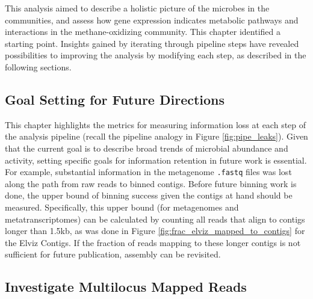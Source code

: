 This analysis aimed to describe a holistic picture of the microbes in the communities, and assess how gene expression indicates metabolic pathways and interactions in the methane-oxidizing community.
This chapter identified a starting point.
Insights gained by iterating through pipeline steps have revealed possibilities to improving the analysis by modifying each step, as described in the following sections.

\subsection{Goal Setting for Future Directions}    %

This chapter highlights the metrics for measuring information loss at each step of the analysis pipeline (recall the pipeline analogy in Figure \ref{fig:pipe_leaks}).
Given that the current goal is to describe broad trends of microbial abundance and activity, setting specific goals for information retention in future work is essential.
For example, substantial information in the metagenome \texttt{.fastq} files was lost along the path from raw reads to binned contigs.
Before future binning work is done, the upper bound of binning success given the contigs at hand should be measured.
Specifically, this upper bound (for metagenomes and metatranscriptomes) can be calculated by counting all reads that align to contigs longer than 1.5kb, as was done in Figure \ref{fig:frac_elviz_mapped_to_contigs} for the Elviz Contigs.
If the fraction of reads mapping to these longer contigs is not sufficient for future publication, assembly can be revisited.%


\subsection{Investigate Multilocus Mapped Reads}    %
\label{sect:multipli_mapped_reads}

